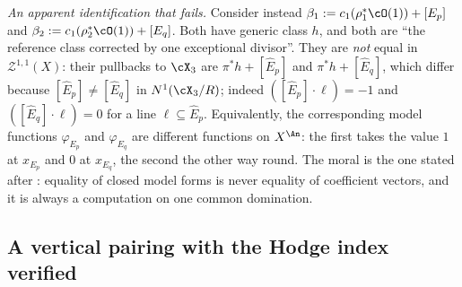 \begin{example}
\emph{An apparent identification that fails.}  Consider instead
\(\beta_1:=c_1(\rho_1^*\cO(1))+[E_p]\) and
\(\beta_2:=c_1(\rho_2^*\cO(1))+[E_q]\).  Both have generic class \(h\), and
both are ``the reference class corrected by one exceptional divisor''.  They
are \emph{not} equal in \(\mathcal Z^{1,1}(X)\): their pullbacks to
\(\cX_3\) are \(\pi^*h+[\widehat E_p]\) and \(\pi^*h+[\widehat E_q]\),
which differ because \([\widehat E_p]\neq[\widehat E_q]\) in
\(N^1(\cX_3/R)\); indeed \(([\widehat E_p]\cdot\ell)=-1\) and
\(([\widehat E_q]\cdot\ell)=0\) for a line \(\ell\subseteq\widehat E_p\).
Equivalently, the corresponding model functions
\(\varphi_{E_p}\) and \(\varphi_{E_q}\) are different functions on
\(X^{\An}\): the first takes the value \(1\) at \(x_{E_p}\) and \(0\) at
\(x_{E_q}\), the second the other way round.  The moral is the one stated
after : equality of closed model forms is
never equality of coefficient vectors, and it is always a computation on one
common domination.
\end{example}

\subsection{A vertical pairing with the Hodge index verified}
\label{sec:ch20-ex-hodge}

